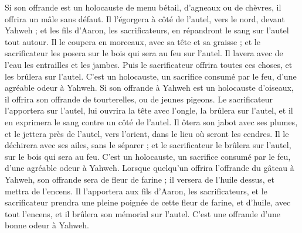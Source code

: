 \begin{multicols}{2}
Si son offrande est un holocauste de menu bétail, d'agneaux ou de chèvres, il offrira un mâle sans défaut.
Il l'égorgera à côté de l'autel, vers le nord, devant Yahweh ; et les fils d'Aaron, les sacrificateurs, en répandront le sang sur l'autel tout autour.
Il le coupera en  morceaux, avec sa tête et sa graisse ; et le sacrificateur les posera sur le bois qui sera au feu sur l'autel.
Il lavera avec de l'eau les entrailles et les jambes. Puis le sacrificateur offrira toutes ces choses, et les brûlera sur l'autel. C'est un holocauste, un sacrifice consumé par le feu, d’une agréable odeur à Yahweh.
Si son offrande à Yahweh est un holocauste d'oiseaux, il offrira son offrande de tourterelles, ou de jeunes pigeons.
Le sacrificateur l'apportera sur l'autel, lui ouvrira la tête avec l'ongle, la brûlera sur l'autel, et il en exprimera le sang contre un côté de l'autel.
Il ôtera son jabot avec ses plumes, et le jettera près de l'autel, vers l'orient, dans le lieu où seront les cendres.
Il le déchirera avec ses ailes, sans le séparer ; et le sacrificateur le brûlera sur l'autel, sur le bois qui sera au feu. C'est un holocauste, un sacrifice consumé par le feu, d'une agréable odeur à Yahweh.
\VerseOne{}Lorsque quelqu’un offrira l'offrande du gâteau à Yahweh, son offrande sera de fleur de farine ; il versera de l'huile dessus, et mettra de l'encens.
Il l'apportera aux fils d'Aaron, les sacrificateurs, et le sacrificateur prendra une pleine poignée de cette fleur de farine, et d’huile, avec tout l'encens, et il brûlera son mémorial sur l'autel. C'est une offrande d’une bonne odeur à Yahweh.

\end{multicols}
